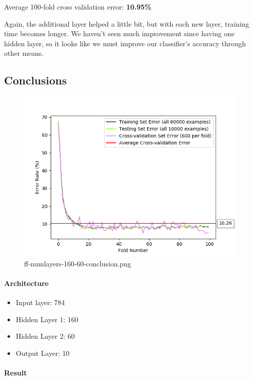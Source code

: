 \documentclass[11pt]{article}
\makeatletter
\def\maxwidth{\ifdim\Gin@nat@width>\linewidth\linewidth
    \else\Gin@nat@width\fi}
\let\Oldincludegraphics\includegraphics
\renewcommand{\includegraphics}[1]{\Oldincludegraphics[width=.8\maxwidth]{#1}}
\providecommand{\tightlist}{%
      \setlength{\itemsep}{0pt}\setlength{\parskip}{0pt}}
\makeatother
\begin{document}
Average 100-fold cross validation error: \textbf{10.95\%}

Again, the additional layer helped a little bit, but with each new
layer, training time becomes longer. We haven't seen much improvement
since having one hidden layer, so it looks like we must improve
our classifier's accuracy through other means.

\pagebreak

\subsection{Conclusions}\label{conclusions}

\begin{figure}[htbp]
\centering
\includegraphics{plots/ff-numlayers-160-60-conclusion.png}
\caption{ff-numlayers-160-60-conclusion.png}
\end{figure}

\paragraph{Architecture}\label{architecture-5}

\begin{itemize}
\tightlist
\item
  Input layer: 784
\item
  Hidden Layer 1: 160
\item
  Hidden Layer 2: 60
\item
  Output Layer: 10
\end{itemize}

\paragraph{Result}\label{result-4}
\end{document}
